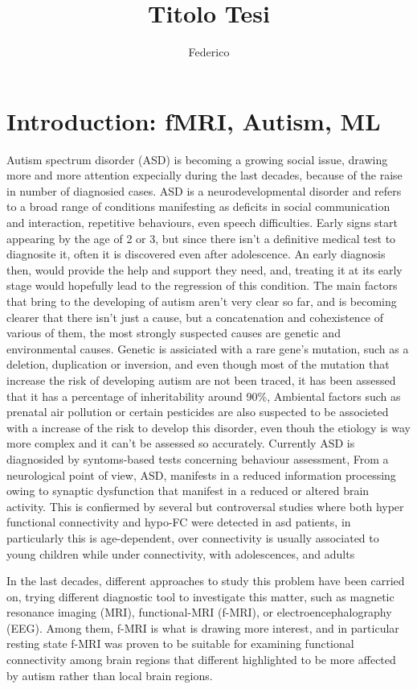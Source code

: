 \documentclass[a4paper,11pt]{article}
\title{Titolo Tesi}
\author{Federico}
\begin{document}
\maketitle
\tableofcontents

\section{Introduction: fMRI, Autism, ML}
Autism spectrum disorder (ASD) is becoming a growing social issue, drawing more and more attention expecially during the last decades, because of the raise in number of diagnosied cases.
ASD is a neurodevelopmental disorder and refers to a broad range of conditions manifesting as deficits in social communication and interaction, repetitive behaviours, even speech difficulties.
Early signs start appearing by the age of 2 or 3, but since there isn't a definitive medical test to diagnosite it, often it is discovered even after adolescence. An early diagnosis then, would provide the help and support they need, and, treating it at its early stage would hopefully lead to the regression of this condition.
The main factors that bring to the developing of autism aren't very clear so far, and is becoming clearer that there isn't just a cause, but a concatenation and cohexistence of various of them, the most strongly suspected causes are genetic and environmental causes.
Genetic is assiciated with a rare gene's mutation, such as a deletion, duplication or inversion, and even though most of the mutation that increase the risk of developing autism are not been traced, it has been assessed that it has a percentage of inheritability around 90\%,
Ambiental factors such as prenatal air pollution or certain pesticides are also suspected to be associeted with a increase of the risk to develop this disorder, even thouh the etiology is way more complex and it can't be assessed so accurately.
Currently ASD is diagnosided by syntoms-based tests concerning behaviour assessment,
From a neurological point of view, ASD, manifests in a reduced information processing owing to synaptic dysfunction that manifest in a reduced or altered brain activity.
This is confiermed by several but controversal studies where both hyper functional connectivity and hypo-FC were detected in asd patients, in particularly this is age-dependent, over connectivity is usually associated to young children while under connectivity, with adolescences, and adults

In the last decades, different approaches to study this problem have been carried on, trying different diagnostic tool to investigate this matter, such as magnetic resonance imaging (MRI), functional-MRI (f-MRI), or electroencephalography (EEG).
Among them, f-MRI is what is drawing more interest, and in particular resting state f-MRI was proven to be suitable for examining functional connectivity among brain regions that different highlighted to be more affected by autism rather than local brain regions.
\end{document}
